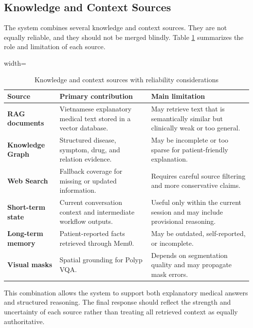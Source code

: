 \subsection{Knowledge and Context Sources}

The system combines several knowledge and context sources. They are not equally reliable, and they should not be merged blindly. Table \ref{table:context-source-reliability} summarizes the role and limitation of each source.

\begin{table}[H]
\centering
\begin{adjustbox}{width=\textwidth}
\begin{tabular}{>{\RaggedRight\arraybackslash}p{} >{\RaggedRight\arraybackslash}p{} >{\RaggedRight\arraybackslash}p{}}
\hline\hline
\textbf{Source} & \textbf{Primary contribution} & \textbf{Main limitation} \\
\hline
\textbf{RAG documents} & Vietnamese explanatory medical text stored in a vector database. & May retrieve text that is semantically similar but clinically weak or too general. \\
\textbf{Knowledge Graph} & Structured disease, symptom, drug, and relation evidence. & May be incomplete or too sparse for patient-friendly explanation. \\
\textbf{Web Search} & Fallback coverage for missing or updated information. & Requires careful source filtering and more conservative claims. \\
\textbf{Short-term state} & Current conversation context and intermediate workflow outputs. & Useful only within the current session and may include provisional reasoning. \\
\textbf{Long-term memory} & Patient-reported facts retrieved through Mem0. & May be outdated, self-reported, or incomplete. \\
\textbf{Visual masks} & Spatial grounding for Polyp VQA. & Depends on segmentation quality and may propagate mask errors. \\
\hline\hline
\end{tabular}
\end{adjustbox}
\caption{Knowledge and context sources with reliability considerations}
\label{table:context-source-reliability}
\end{table}

This combination allows the system to support both explanatory medical answers and structured reasoning. The final response should reflect the strength and uncertainty of each source rather than treating all retrieved context as equally authoritative.

